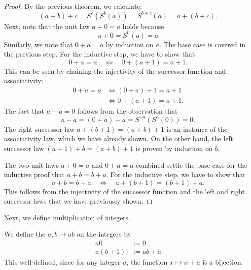 \begin{proof}
  By the previous theorem, we calculate:
  \begin{equation*}
    (a+b)+c= S^c(S^b(a))=S^{b+c}(a)=a+(b+c).
  \end{equation*}
  Next, note that the unit law $a+0=a$ holds because
  \begin{equation*}
    a+0=S^0(a)=a
  \end{equation*}
  Similarly, we note that $0+a=a$ by induction on $a$. The base case is covered in the previous step. For the inductive step, we have to show that
  \begin{equation*}
    0+a=a\quad\Leftrightarrow\quad 0+(a+1)=a+1.
  \end{equation*}
  This can be seen by chaining the injectivity of the successor function and associativity:
  \begin{align*}
    0+a=a & \Leftrightarrow (0+a)+1=a+1 \\
          & \Leftrightarrow 0+(a+1)=a+1.
  \end{align*}
  The fact that $a-a=0$ follows from the observation that
  \begin{equation*}
    a-a=(0+a)-a=S^{-a}(S^a(0))=0.
  \end{equation*}
  The right successor law $a+(b+1)=(a+b)+1$ is an instance of the associativity law, which we have already shown. On the other hand, the left successor law $(a+1)+b=(a+b)+1$ is proven by induction on $b$.
  
  The two unit laws $a+0=a$ and $0+a=a$ combined settle the base case for the inductive proof that $a+b=b+a$. For the inductive step, we have to show that
  \begin{equation*}
    a+b=b+a \quad\Leftrightarrow\quad a+(b+1)=(b+1)+a.
  \end{equation*}
  This follows from the injectivity of the successor function and the left and right successor laws that we have previously shown.
\end{proof}

Next, we define multiplication of integers.

\begin{definition}
  We define the  $a,b\mapsto ab$ on the integers by
  \begin{align*}
    a0 & := 0 \\
    a(b+1) & := ab+a
  \end{align*}
  This well-defined, since for any integer $a$, the function $x\mapsto x+a$ is a bijection.
\end{definition}

